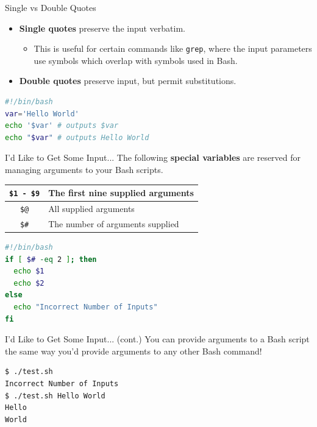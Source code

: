 \documentclass[11pt]{beamer}
\begin{document}
\begin{frame}[fragile=singleslide]{Single vs Double Quotes}

\begin{itemize}
\item \textbf{Single quotes} preserve the input verbatim.
\begin{itemize}
\item This is useful for certain commands like \texttt{grep}, where the input parameters use symbols which overlap with symbols used in Bash. 
\end{itemize}
\item \textbf{Double quotes} preserve input, but permit substitutions.
\end{itemize}
\begin{lstlisting}[style=terminal, language=bash]
#!/bin/bash
var='Hello World'
echo '$var' # outputs $var
echo "$var" # outputs Hello World 
\end{lstlisting}

\end{frame}

\begin{frame}[fragile=singleslide]{I'd Like to Get Some Input...}
The following \textbf{special variables} are reserved for managing arguments to your Bash scripts.
\center
\begin{tabular}{| c | l |}
\hline
\texttt{\$1 - \$9} & The first nine supplied arguments \\ \hline
\texttt{\$@} & All supplied arguments \\ \hline
\texttt{\$\#} & The number of arguments supplied \\ \hline
\end{tabular}

\begin{lstlisting}[style=terminal, language=bash]
#!/bin/bash
if [ $# -eq 2 ]; then
  echo $1
  echo $2
else
  echo "Incorrect Number of Inputs"
fi
\end{lstlisting}

\end{frame}

\begin{frame}[fragile=singleslide]{I'd Like to Get Some Input... (cont.)}
You can provide arguments to a Bash script the same way you'd provide arguments to any other Bash command! 
\begin{lstlisting}[style=terminal, language=bash]
$ ./test.sh  
Incorrect Number of Inputs
$ ./test.sh Hello World
Hello
World
\end{lstlisting}

\end{frame}
\end{document}
